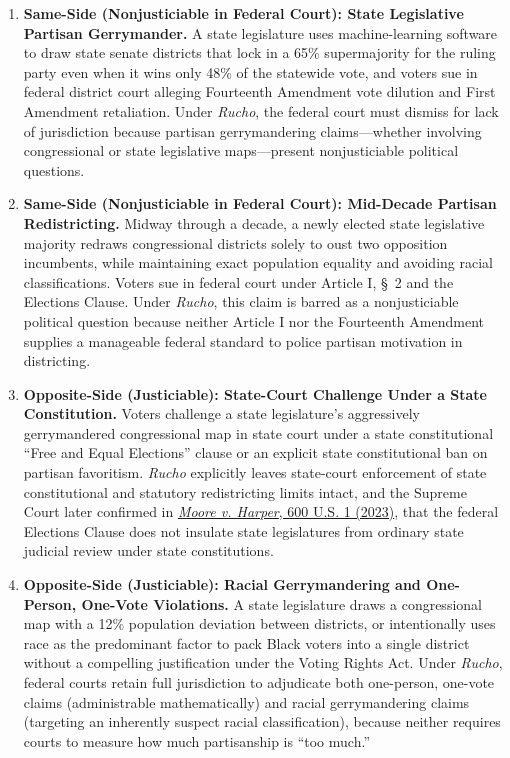 \documentclass[12pt]{article}
\begin{document}
\begin{enumerate}
\item \textbf{Same-Side (Nonjusticiable in Federal Court): State Legislative Partisan Gerrymander.} A state legislature uses machine-learning software to draw state senate districts that lock in a 65\% supermajority for the ruling party even when it wins only 48\% of the statewide vote, and voters sue in federal district court alleging Fourteenth Amendment vote dilution and First Amendment retaliation. Under \textit{Rucho}, the federal court must dismiss for lack of jurisdiction because partisan gerrymandering claims---whether involving congressional or state legislative maps---present nonjusticiable political questions.
\item \textbf{Same-Side (Nonjusticiable in Federal Court): Mid-Decade Partisan Redistricting.} Midway through a decade, a newly elected state legislative majority redraws congressional districts solely to oust two opposition incumbents, while maintaining exact population equality and avoiding racial classifications. Voters sue in federal court under Article I, \S~2 and the Elections Clause. Under \textit{Rucho}, this claim is barred as a nonjusticiable political question because neither Article I nor the Fourteenth Amendment supplies a manageable federal standard to police partisan motivation in districting.
\item \textbf{Opposite-Side (Justiciable): State-Court Challenge Under a State Constitution.} Voters challenge a state legislature's aggressively gerrymandered congressional map in state court under a state constitutional ``Free and Equal Elections'' clause or an explicit state constitutional ban on partisan favoritism. \textit{Rucho} explicitly leaves state-court enforcement of state constitutional and statutory redistricting limits intact, and the Supreme Court later confirmed in \href{https://www.supremecourt.gov/opinions/22pdf/21-1271_3f14.pdf}{\textit{Moore v. Harper}, 600 U.S. 1 (2023)}, that the federal Elections Clause does not insulate state legislatures from ordinary state judicial review under state constitutions.
\item \textbf{Opposite-Side (Justiciable): Racial Gerrymandering and One-Person, One-Vote Violations.} A state legislature draws a congressional map with a 12\% population deviation between districts, or intentionally uses race as the predominant factor to pack Black voters into a single district without a compelling justification under the Voting Rights Act. Under \textit{Rucho}, federal courts retain full jurisdiction to adjudicate both one-person, one-vote claims (administrable mathematically) and racial gerrymandering claims (targeting an inherently suspect racial classification), because neither requires courts to measure how much partisanship is ``too much.''

\end{enumerate}
\end{document}
